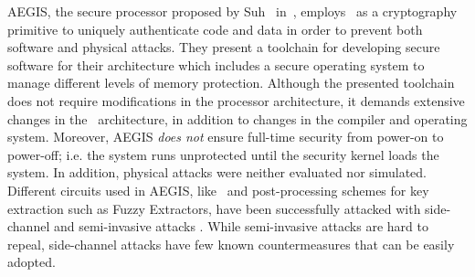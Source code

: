 AEGIS, the secure processor proposed by Suh \etal~in~\cite{Suh2005}, employs \pufs~as a cryptography primitive to uniquely authenticate code and data in order to prevent both software and physical attacks. They present a toolchain for developing secure software for their architecture which includes a secure operating system to manage different levels of memory protection. Although the presented toolchain does not require modifications in the processor architecture, it demands extensive changes in the \soc~architecture, in addition to changes in the compiler and operating system. Moreover, AEGIS \emph{does not} ensure full-time security from power-on to power-off; i.e. the system runs unprotected until the security kernel loads the system. In addition, physical attacks were neither evaluated nor simulated. Different circuits used in AEGIS, like \pufs~and post-processing schemes for key extraction such as Fuzzy Extractors, have been successfully attacked with side-channel \cite{Merli2011,Tajik2016:Photonic} and semi-invasive attacks \cite{Tajik2015:LaserAttack}. While semi-invasive attacks are hard to repeal, side-channel attacks have few known countermeasures \cite{Merli2013:Masking} that can be easily adopted.



